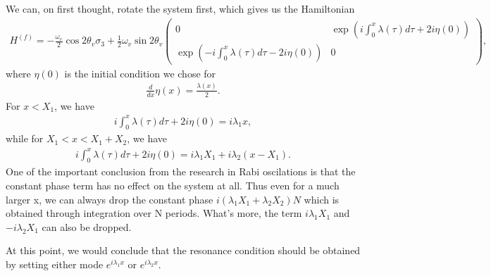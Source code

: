 \documentclass[letterpaper,12pt,english]{sphinxmanual}
\begin{document}
We can, on first thought, rotate the system first, which gives us the Hamiltonian
\begin{equation*}
\begin{split}H^{(f)} = -\frac{\omega_v}{2} \cos 2\theta_v \sigma_3 + \frac{1}{2} \omega_v \sin 2\theta_v \begin{pmatrix}
0 & \exp\left( i\int_0^x \lambda(\tau) d\tau + 2i \eta(0) \right) \\
\exp\left( -i\int_0^x \lambda(\tau) d\tau - 2i \eta(0) \right) & 0
\end{pmatrix},\end{split}
\end{equation*}
where \(\eta(0)\) is the initial condition we chose for
\begin{equation*}
\begin{split}\frac{d}{dx}\eta(x) = \frac{\lambda(x)}{2}.\end{split}
\end{equation*}
For \(x<X_1\), we have
\begin{equation*}
\begin{split}i\int_0^x \lambda(\tau) d\tau + 2i \eta(0) = i \lambda_1 x,\end{split}
\end{equation*}
while for \(X_1<x<X_1+X_2\), we have
\begin{equation*}
\begin{split}i\int_0^x \lambda(\tau) d\tau + 2i \eta(0) = i \lambda_1 X_1 + i \lambda_2 (x-X_1).\end{split}
\end{equation*}
One of the important conclusion from the research in Rabi oscilations is that the constant phase term has no effect on the system at all. Thus even for a much larger x, we can always drop the constant phase \(i(\lambda_1X_1+\lambda_2X_2)N\) which is obtained through integration over N periods. What's more, the term \(i \lambda_1 X_1\) and \(-i\lambda_2X_1\) can also be dropped.

At this point, we would conclude that the resonance condition should be obtained by setting either mode \(e^{i\lambda_1 x}\) or \(e^{i\lambda_2 x}\).
\end{document}
